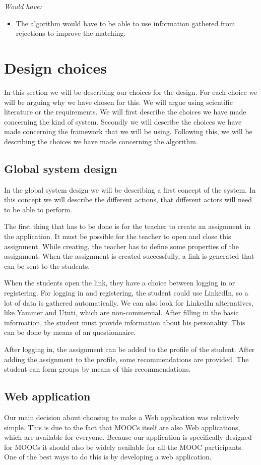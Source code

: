 \documentclass[]{article}
\newcommand{\reqr}[1]{{\noindent\emph{#1:}}}
\begin{document}
\reqr{Would have}
\begin{itemize}
\item The algorithm would have to be able to use information gathered from rejections to improve the matching.
\end{itemize}

\section{Design choices}
In this section we will be describing our choices for the design.
For each choice we will be arguing why we have chosen for this.
We will argue using scientific literature or the requirements.
We will first describe the choices we have made concerning the kind of system.
Secondly we will describe the choices we have made concerning the framework that we will be using.
Following this, we will be describing the choices we have made concerning the algorithm.

\subsection{Global system design}
In the global system design we will be describing a first concept of the system.
In this concept we will describe the different actions, that different actors will need to be able to perform.

The first thing that has to be done is for the teacher to create an assignment in the application.
It must be possible for the teacher to open and close this assignment. 
While creating, the teacher has to define some properties of the assignment.
When the assignment is created successfully, a link is generated that can be sent to the students.

When the students open the link, they have a choice between logging in or registering.
For logging in and registering, the student could use LinkedIn, so a lot of data is gathered automatically.
We can also look for LinkedIn alternatives, like Yammer and Ututi, which are non-commercial.
After filling in the basic information, the student must provide information about his personality.
This can be done by means of an questionnaire.

After logging in, the assignment can be added to the profile of the student.
After adding the assignment to the profile, some recommendations are provided.
The student can form groups by means of this recommendations.

\subsection{Web application}
Our main decision about choosing to make a Web application was relatively simple.
This is due to the fact that MOOCs itself are also Web applications, which are available for everyone.
Because our application is specifically designed for MOOCs it should also be widely available for all the MOOC participants.
One of the best ways to do this is by developing a web application.
\end{document}
